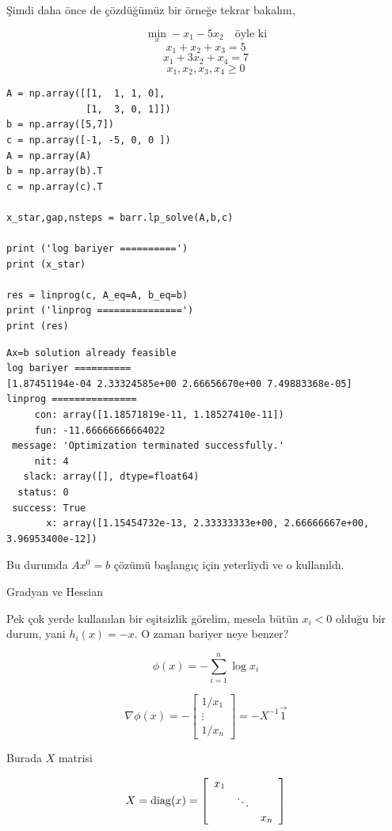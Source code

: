 \documentclass[12pt,fleqn]{article}\usepackage{../../common}
\begin{document}
Şimdi daha önce de çözdüğümüz bir örneğe tekrar bakalım,

$$
\min_x -x_1 - 5x_2 \quad \textrm{öyle ki}
$$
$$
x_1 + x_2 + x_3  = 5 
$$
$$
x_1 + 3 x_2 + x_4 = 7
$$
$$
x_1,x_2,x_3,x_4 \ge 0
$$

\begin{verbatim}
A = np.array([[1,  1, 1, 0],
              [1,  3, 0, 1]])
b = np.array([5,7])
c = np.array([-1, -5, 0, 0 ])
A = np.array(A)
b = np.array(b).T
c = np.array(c).T

x_star,gap,nsteps = barr.lp_solve(A,b,c)

print ('log bariyer ==========')
print (x_star)

res = linprog(c, A_eq=A, b_eq=b)
print ('linprog ===============')
print (res)
\end{verbatim}

\begin{verbatim}
Ax=b solution already feasible
log bariyer ==========
[1.87451194e-04 2.33324585e+00 2.66656670e+00 7.49883368e-05]
linprog ===============
     con: array([1.18571819e-11, 1.18527410e-11])
     fun: -11.66666666664022
 message: 'Optimization terminated successfully.'
     nit: 4
   slack: array([], dtype=float64)
  status: 0
 success: True
       x: array([1.15454732e-13, 2.33333333e+00, 2.66666667e+00, 3.96953400e-12])
\end{verbatim}

Bu durumda $Ax^0=b$ çözümü başlangıç için yeterliydi ve o kullanıldı.

Gradyan ve Hessian

Pek çok yerde kullanılan bir eşitsizlik görelim, mesela bütün $x_i < 0$
olduğu bir durum, yani $h_i(x) = -x$. O zaman bariyer neye benzer? 

$$
\phi(x) = - \sum _{i=1}^{n} \log x_i
$$

$$
\nabla \phi(x) = - \left[\begin{array}{c}
1/x_1  \\ 
\vdots \\
1/x_n
\end{array}\right] 
= - X^{-1} \vec{1}
$$

Burada $X$ matrisi 

$$
X = \operatorname{diag}(x) = 
\left[\begin{array}{ccc}
x_1 & & \\
    & \ddots & \\
    & & x_n
\end{array}\right]
$$
\end{document}
